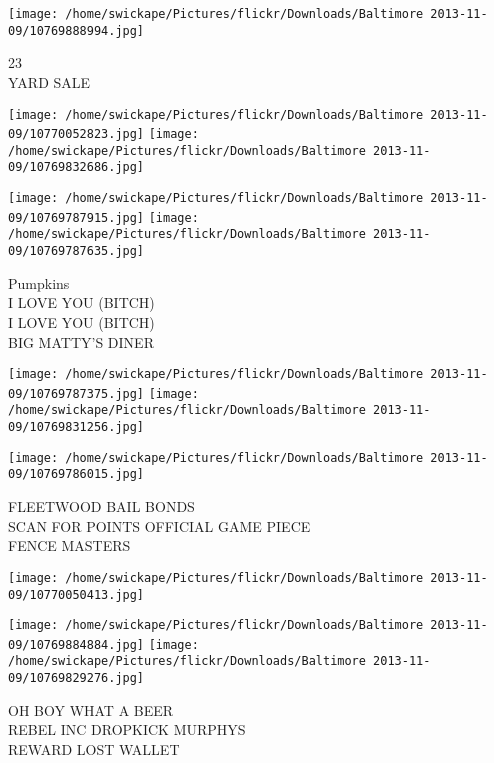 \documentclass[10pt,letterpaper]{article}
\begin{document}
\vspace{0.25in}
\texttt{[image: /home/swickape/Pictures/flickr/Downloads/Baltimore 2013-11-09/10769888994.jpg]}

23\\
YARD SALE\\
\pagebreak

\texttt{[image: /home/swickape/Pictures/flickr/Downloads/Baltimore 2013-11-09/10770052823.jpg]}
\texttt{[image: /home/swickape/Pictures/flickr/Downloads/Baltimore 2013-11-09/10769832686.jpg]}

\texttt{[image: /home/swickape/Pictures/flickr/Downloads/Baltimore 2013-11-09/10769787915.jpg]}
\texttt{[image: /home/swickape/Pictures/flickr/Downloads/Baltimore 2013-11-09/10769787635.jpg]}

Pumpkins\\
I LOVE YOU (BITCH)\\
I LOVE YOU (BITCH)\\
BIG MATTY'S DINER\\
\pagebreak

\texttt{[image: /home/swickape/Pictures/flickr/Downloads/Baltimore 2013-11-09/10769787375.jpg]}
\texttt{[image: /home/swickape/Pictures/flickr/Downloads/Baltimore 2013-11-09/10769831256.jpg]}

\vspace{0.25in}
\texttt{[image: /home/swickape/Pictures/flickr/Downloads/Baltimore 2013-11-09/10769786015.jpg]}

FLEETWOOD BAIL BONDS\\
SCAN FOR POINTS OFFICIAL GAME PIECE\\
FENCE MASTERS\\
\pagebreak

\texttt{[image: /home/swickape/Pictures/flickr/Downloads/Baltimore 2013-11-09/10770050413.jpg]}

\vspace{0.25in}
\texttt{[image: /home/swickape/Pictures/flickr/Downloads/Baltimore 2013-11-09/10769884884.jpg]}
\texttt{[image: /home/swickape/Pictures/flickr/Downloads/Baltimore 2013-11-09/10769829276.jpg]}

OH BOY WHAT A BEER\\
REBEL INC DROPKICK MURPHYS\\
REWARD LOST WALLET\\
\pagebreak
\end{document}
